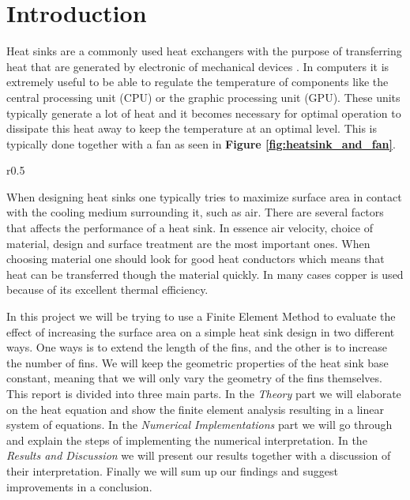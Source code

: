 \section{Introduction}
Heat sinks are a commonly used heat exchangers with the purpose of transferring heat that are generated by electronic of mechanical devices \cite{wiki_hs}. In computers it is extremely useful to be able to regulate the temperature of components like the central processing unit (CPU) or the graphic processing unit	(GPU). These units typically generate a lot of heat and it becomes necessary for optimal operation to dissipate this heat away to keep the temperature at an optimal level. This is typically done together with a fan as seen in \textbf{Figure \ref{fig:heatsink_and_fan}}. 

\begin{wrapfigure}{r}{0.5\textwidth}
	\begin{center}
	\end{center}
	\caption{Heat sink and fan on processing unit. Source: \cite{wiki_hs}}
    \label{fig:heatsink_and_fan}
\end{wrapfigure}

When designing heat sinks one typically tries to maximize surface area in contact with the cooling medium surrounding it, such as air. There are several factors that affects the performance of a heat sink. In essence air velocity, choice of material, design and surface treatment are the most important ones. When choosing material one should look for good heat conductors which means that heat can be transferred though the material quickly. In many cases copper is used because of its excellent thermal efficiency.

In this project we will be trying to use a Finite Element Method to evaluate the effect of increasing the surface area on a simple heat sink design in two different ways. One ways is to extend the length of the fins, and the other is to increase the number of fins. We will keep the geometric properties of the heat sink base constant, meaning that we will only vary the geometry of the fins themselves. This report is divided into three main parts. In the \textit{Theory} part we will elaborate on the heat equation and show the finite element analysis resulting in a linear system of equations. In the \textit{Numerical Implementations} part we will go through and explain the steps of implementing the numerical interpretation. In the \textit{Results and Discussion} we will present our results together with a discussion of their interpretation. Finally we will sum up our findings and suggest improvements in a conclusion.